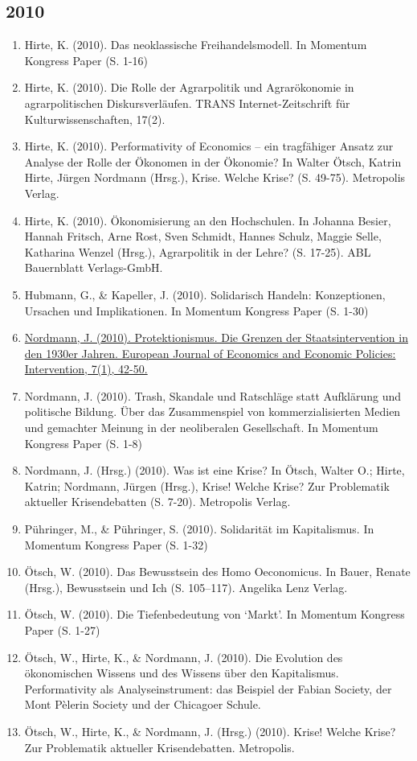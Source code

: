 \subsection*{2010}
\begin{enumerate}
	 \item Hirte, K. (2010). Das neoklassische Freihandelsmodell. In Momentum Kongress Paper (S. 1-16)
	 \item Hirte, K. (2010). Die Rolle der Agrarpolitik und Agrarökonomie in agrarpolitischen Diskursverläufen. TRANS Internet-Zeitschrift für Kulturwissenschaften, 17(2).
	 \item Hirte, K. (2010). Performativity of Economics -- ein tragfähiger Ansatz zur Analyse der Rolle der Ökonomen in der Ökonomie? In Walter Ötsch, Katrin Hirte, Jürgen Nordmann (Hrsg.), Krise. Welche Krise? (S. 49-75). Metropolis Verlag.
	 \item Hirte, K. (2010). Ökonomisierung an den Hochschulen. In Johanna Besier, Hannah Fritsch, Arne Rost, Sven Schmidt, Hannes Schulz, Maggie Selle, Katharina Wenzel (Hrsg.), Agrarpolitik in der Lehre? (S. 17-25). ABL Bauernblatt Verlags-GmbH.
	 \item Hubmann, G., \& Kapeller, J. (2010). Solidarisch Handeln: Konzeptionen, Ursachen und Implikationen. In Momentum Kongress Paper (S. 1-30)
	 \item \href{https://doi.org/10.4337/ejeep.2010.01.05}{Nordmann, J. (2010). Protektionismus. Die Grenzen der Staatsintervention in den 1930er Jahren. European Journal of Economics and Economic Policies: Intervention, 7(1), 42-50.}
	 \item Nordmann, J. (2010). Trash, Skandale und Ratschläge statt Aufklärung und politische Bildung. Über das Zusammenspiel von kommerzialisierten Medien und gemachter Meinung in der neoliberalen Gesellschaft. In Momentum Kongress Paper (S. 1-8)
	 \item Nordmann, J. (Hrsg.) (2010). Was ist eine Krise? In Ötsch, Walter O.; Hirte, Katrin; Nordmann, Jürgen (Hrsg.), Krise! Welche Krise? Zur Problematik aktueller Krisendebatten (S. 7-20). Metropolis Verlag.
	 \item Pühringer, M., \& Pühringer, S. (2010). Solidarität im Kapitalismus. In Momentum Kongress Paper (S. 1-32)
	 \item Ötsch, W. (2010). Das Bewusstsein des Homo Oeconomicus. In Bauer, Renate (Hrsg.), Bewusstsein und Ich (S. 105–117). Angelika Lenz Verlag.
	 \item Ötsch, W. (2010). Die Tiefenbedeutung von ‘Markt’. In Momentum Kongress Paper (S. 1-27)
	 \item Ötsch, W., Hirte, K., \& Nordmann, J. (2010). Die Evolution des ökonomischen Wissens und des Wissens über den Kapitalismus. Performativity als Analyseinstrument: das Beispiel der Fabian Society, der Mont Pèlerin Society und der Chicagoer Schule.
	 \item Ötsch, W., Hirte, K., \& Nordmann, J. (Hrsg.) (2010). Krise! Welche Krise? Zur Problematik aktueller Krisendebatten. Metropolis.
\end{enumerate}
